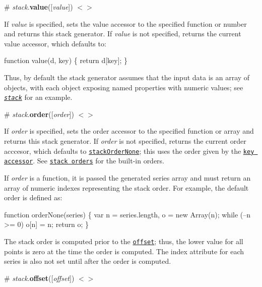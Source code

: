 \label{_stack_value}%
\# {\itshape stack}.{\bfseries value}(\mbox{[}{\itshape value}\mbox{]}) \href{https://github.com/d3/d3-shape/blob/master/src/stack.js#L44}{\tt $<$$>$}

If {\itshape value} is specified, sets the value accessor to the specified function or number and returns this stack generator. If {\itshape value} is not specified, returns the current value accessor, which defaults to\+:


\begin{DoxyCode}
function value(d, key) \{
  return d[key];
\}
\end{DoxyCode}


Thus, by default the stack generator assumes that the input data is an array of objects, with each object exposing named properties with numeric values; see \href{#_stack}{\tt {\itshape stack}} for an example.

\label{_stack_order}%
\# {\itshape stack}.{\bfseries order}(\mbox{[}{\itshape order}\mbox{]}) \href{https://github.com/d3/d3-shape/blob/master/src/stack.js#L48}{\tt $<$$>$}

If {\itshape order} is specified, sets the order accessor to the specified function or array and returns this stack generator. If {\itshape order} is not specified, returns the current order acccesor, which defaults to \href{#stackOrderNone}{\tt stack\+Order\+None}; this uses the order given by the \href{#stack_key}{\tt key accessor}. See \href{#stack-orders}{\tt stack orders} for the built-\/in orders.

If {\itshape order} is a function, it is passed the generated series array and must return an array of numeric indexes representing the stack order. For example, the default order is defined as\+:


\begin{DoxyCode}
function orderNone(series) \{
  var n = series.length, o = new Array(n);
  while (--n >= 0) o[n] = n;
  return o;
\}
\end{DoxyCode}


The stack order is computed prior to the \href{#stack_offset}{\tt offset}; thus, the lower value for all points is zero at the time the order is computed. The index attribute for each series is also not set until after the order is computed.

\label{_stack_offset}%
\# {\itshape stack}.{\bfseries offset}(\mbox{[}{\itshape offset}\mbox{]}) \href{https://github.com/d3/d3-shape/blob/master/src/stack.js#L52}{\tt $<$$>$}

